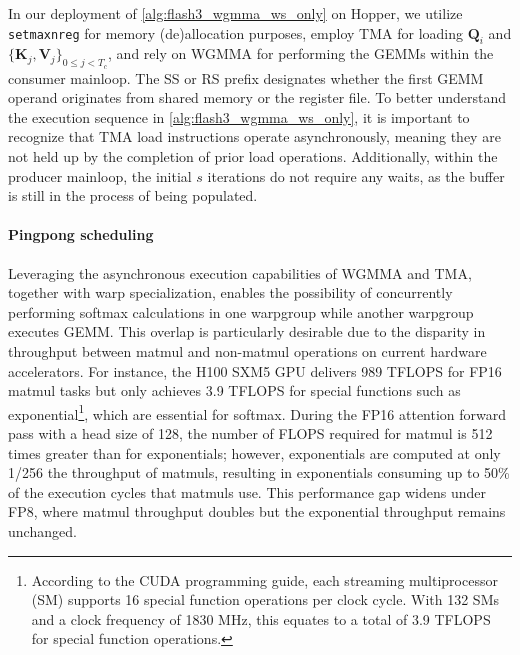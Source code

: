 In our deployment of \cref{alg:flash3_wgmma_ws_only} on Hopper, we utilize \verb|setmaxnreg| for memory (de)allocation purposes, employ TMA for loading $\mathbf{Q}_i$ and $\{ \mathbf{K}_j, \mathbf{V}_j \}_{0 \leq j < T_c}$, and rely on WGMMA for performing the GEMMs within the consumer mainloop. The SS or RS prefix designates whether the first GEMM operand originates from shared memory or the register file. To better understand the execution sequence in \cref{alg:flash3_wgmma_ws_only}, it is important to recognize that TMA load instructions operate asynchronously, meaning they are not held up by the completion of prior load operations. Additionally, within the producer mainloop, the initial $s$ iterations do not require any waits, as the buffer is still in the process of being populated.

\paragraph{Pingpong scheduling} Leveraging the asynchronous execution capabilities of WGMMA and TMA, together with warp specialization, enables the possibility of concurrently performing softmax calculations in one warpgroup while another warpgroup executes GEMM. This overlap is particularly desirable due to the disparity in throughput between matmul and non-matmul operations on current hardware accelerators. For instance, the H100 SXM5 GPU delivers 989 TFLOPS for FP16 matmul tasks but only achieves 3.9 TFLOPS for special functions such as exponential\footnote{According to the CUDA programming guide, each streaming multiprocessor (SM) supports 16 special function operations per clock cycle. With 132 SMs and a clock frequency of 1830 MHz, this equates to a total of 3.9 TFLOPS for special function operations.}, which are essential for softmax. During the FP16 attention forward pass with a head size of 128, the number of FLOPS required for matmul is 512 times greater than for exponentials; however, exponentials are computed at only 1/256 the throughput of matmuls, resulting in exponentials consuming up to 50\% of the execution cycles that matmuls use. This performance gap widens under FP8, where matmul throughput doubles but the exponential throughput remains unchanged.

